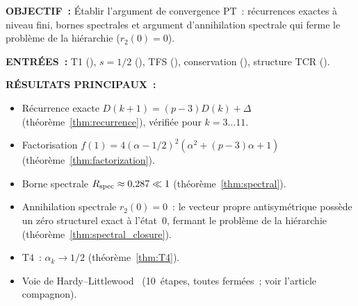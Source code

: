 \documentclass[12pt,a4paper]{article}
\begin{document}
\begin{statusbox}
\textbf{OBJECTIF~:}
  Établir l'argument de convergence PT~: récurrences exactes à
  niveau fini, bornes spectrales et argument d'annihilation
  spectrale qui ferme le problème de la hiérarchie ($r_2(0) = 0$).

\textbf{ENTRÉES~:}
  T1 (\cite{companion_M1}), $s = 1/2$ (\cite{companion_M1}), TFS
  (\cite{companion_M1}), conservation (\cite{companion_M1}),
  structure TCR (\cite{companion_M1}).

\textbf{RÉSULTATS PRINCIPAUX~:}
  \begin{itemize}[nosep]
  \item Récurrence exacte $D(k+1) = (p-3)D(k) + \Delta$
    (théorème~\ref{thm:recurrence}), vérifiée pour $k = 3\ldots11$.
  \item Factorisation $f(1) = 4(\alpha - 1/2)^2(\alpha^2 + (p-3)\alpha + 1)$
    (théorème~\ref{thm:factorization}).
  \item Borne spectrale $R_{\rm spec} \approx 0{,}287 \ll 1$
    (théorème~\ref{thm:spectral}).
  \item Annihilation spectrale $r_2(0) = 0$~: le vecteur propre
    antisymétrique possède un zéro structurel exact à l'état~0,
    fermant le problème de la hiérarchie
    (théorème~\ref{thm:spectral_closure}).
  \item T4~: $\alpha_k \to 1/2$ (théorème~\ref{thm:T4}).
  \item Voie de Hardy--Littlewood~\cite{HardyLittlewood1923}
    (10~étapes, toutes fermées~; voir l'article compagnon).
  \end{itemize}


\end{statusbox}
\end{document}
